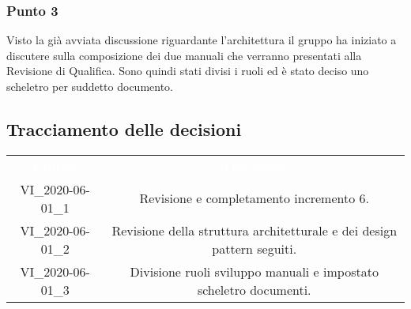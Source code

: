 \subsubsection{Punto 3}
Visto la già avviata discussione riguardante l’architettura il gruppo ha iniziato a discutere sulla composizione dei due manuali che verranno presentati alla Revisione di Qualifica. Sono quindi stati divisi i ruoli ed è stato deciso uno scheletro per suddetto documento.
\pagebreak
\subsection{Tracciamento delle decisioni}
\begin{longtable}{ c | c }
\rowcolor{redafk}
\textcolor{white}{\textbf{Codice}} & \textcolor{white}{\textbf{Decisione}}\\	
		VI\_2020-06-01\_1 & Revisione e completamento incremento 6. \\
		VI\_2020-06-01\_2 & Revisione della struttura architetturale e dei design pattern seguiti. \\
		VI\_2020-06-01\_3 & Divisione ruoli sviluppo manuali e impostato scheletro documenti.
\end{longtable}

